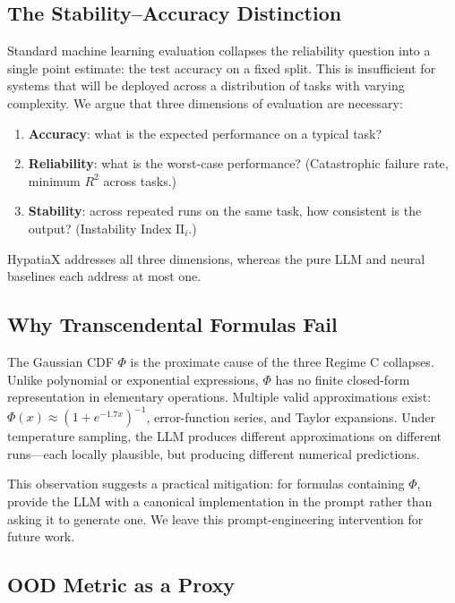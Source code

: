 \documentclass[twoside,11pt]{article}
\newcommand{\Rsq}{R^{2}}
\newcommand{\II}{\mathrm{II}}
\begin{document}
\subsection{The Stability--Accuracy Distinction}

Standard machine learning evaluation collapses the reliability question into a
single point estimate: the test accuracy on a fixed split.  This is insufficient
for systems that will be deployed across a distribution of tasks with varying
complexity.  We argue that three dimensions of evaluation are necessary:
\begin{enumerate}[leftmargin=2em,label=(\roman*)]
  \item \textbf{Accuracy}: what is the expected performance on a typical task?
  \item \textbf{Reliability}: what is the worst-case performance?
    (Catastrophic failure rate, minimum $\Rsq$ across tasks.)
  \item \textbf{Stability}: across repeated runs on the same task, how consistent
    is the output?  (Instability Index $\II_i$.)
\end{enumerate}

HypatiaX addresses all three dimensions, whereas the pure LLM and neural baselines
each address at most one.

\subsection{Why Transcendental Formulas Fail}

The Gaussian CDF $\Phi$ is the proximate cause of the three Regime C collapses.
Unlike polynomial or exponential expressions, $\Phi$ has no finite closed-form
representation in elementary operations.  Multiple valid approximations exist:
$\Phi(x) \approx (1 + e^{-1.7x})^{-1}$, error-function series, and Taylor
expansions.  Under temperature sampling, the LLM produces different approximations
on different runs---each locally plausible, but producing different numerical
predictions.

This observation suggests a practical mitigation: for formulas containing $\Phi$,
provide the LLM with a canonical implementation in the prompt rather than asking it
to generate one.  We leave this prompt-engineering intervention for future work.

\subsection{OOD Metric as a Proxy}
\label{sec:ood_proxy}
\end{document}
